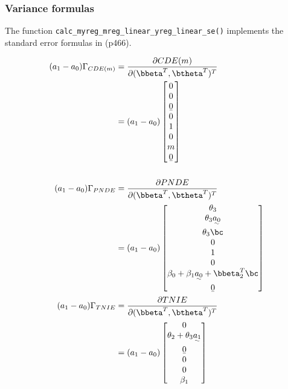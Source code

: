 \documentclass[10pt]{article}
\begin{document}
\subsubsection{Variance formulas}
\label{sec:orgd888de8}
The function \texttt{calc\_myreg\_mreg\_linear\_yreg\_linear\_se()} implements the standard error formulas in \cite{vanderweeleExplanationCausalInference2015} (p466).

\begin{align*}
  (a_{1}-a_{0})\Gamma_{CDE(m)}
  &= \frac{\partial CDE(m)}{\partial (\bbeta^{T},\btheta^{T})^{T}}\\
  &= (a_{1}-a_{0})
    \begin{bmatrix}
      0\\
      0\\
      \b0\\
      0\\
      1\\
      0\\
      m\\
      \b0\\
    \end{bmatrix}\\
  \\
  (a_{1}-a_{0})\Gamma_{PNDE}
  &= \frac{\partial PNDE}{\partial (\bbeta^{T},\btheta^{T})^{T}}\\
  &= (a_{1}-a_{0})
    \begin{bmatrix}
      \theta_{3}\\
      \theta_{3}\uwave{a_{0}}\\
      \theta_{3}\bc\\
      0\\
      1\\
      0\\
      \beta_{0} + \beta_{1}\uwave{a_{0}} + \bbeta_{2}^{T}\bc\\
      \b0\\
    \end{bmatrix}\\
  (a_{1}-a_{0})\Gamma_{TNIE}
  &= \frac{\partial TNIE}{\partial (\bbeta^{T},\btheta^{T})^{T}}\\
  &= (a_{1}-a_{0})
    \begin{bmatrix}
      0\\
      \theta_{2} + \theta_{3}\uwave{a_{1}}\\
      \b0\\
      0\\
      0\\
      \beta_{1}\\

\end{bmatrix}
\end{align*}
\end{document}
